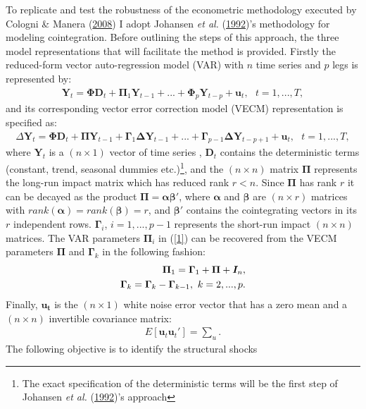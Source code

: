 \documentclass[11pt,preprint, authoryear]{elsarticle}
\numberwithin{equation}{section}
\numberwithin{figure}{section}
\numberwithin{table}{section}
\let\rmarkdownfootnote\footnote%
\def\footnote{\protect\rmarkdownfootnote}
\begin{document}
To replicate and test the robustness of the econometric methodology
executed by Cologni \& Manera
(\protect\hyperlink{ref-cologni2008}{2008}) I adopt Johansen \emph{et
al.} (\protect\hyperlink{ref-johansen1992}{1992})'s methodology for
modeling cointegration. Before outlining the steps of this approach, the
three model representations that will facilitate the method is provided.
Firstly the reduced-form vector auto-regression model (VAR) with \(n\)
time series and \(p\) legs is represented by: \begin{align}
\bm{Y}_t = \boldsymbol{\Phi} \bm{D}_t + \bm{\Pi}_1 \bm{Y}_{t-1} + ...+ \bm{\Phi}_p \bm{Y}_{t-p} + \bm{u}_t, \ \ \ t=1,...,T, \label{1}
\end{align} and its corresponding vector error correction model (VECM)
representation is specified as: \begin{align}
\Delta \bm{Y}_t = \bm{\Phi} \bm{D}_t + \bm{\Pi} \bm{Y}_{t-1} + \bm{\Gamma}_1 \bm{\Delta Y}_{t-1} + ... + \bm{\Gamma}_{p-1} \bm{\Delta} \bm{Y}_{t-p+1} + \bm{u}_t, \ \ \ t=1,...,T, \label{2}
\end{align} where \(\bm{Y}_t\) is a \((n \times 1)\) vector of time
series , \(\bm{D}_t\) contains the deterministic terms (constant, trend,
seasonal dummies etc.)\footnote{The exact specification of the
  deterministic terms will be the first step of Johansen \emph{et al.}
  (\protect\hyperlink{ref-johansen1992}{1992})'s approach}, and the
\((n \times n)\) matrix \(\bm{\Pi}\) represents the long-run impact
matrix which has reduced rank \(r<n\). Since \(\bm{\Pi}\) has rank \(r\)
it can be decayed as the product \(\bm{\Pi} = \bm{\alpha \beta'}\),
where \(\bm{\alpha}\) and \(\bm{\beta}\) are \((n \times r)\) matrices
with \(rank(\bm{\alpha})=rank(\bm{\beta}) = r\), and \(\bm{\beta'}\)
contains the cointegrating vectors in its \(r\) independent rows.
\(\bm{\Gamma}_i\), \(i=1,...,p-1\) represents the short-run impact
\((n \times n)\) matrices. The VAR parameters \(\bm{\Pi}_i\) in
(\ref{1}) can be recovered from the VECM parameters \(\bm{\Pi}\) and
\(\bm{\Gamma}_k\) in the following fashion: \begin{align}
\bm{\Pi}_1 = \bm{\Gamma}_1 + \bm{\Pi} + \bm{I}_n, \notag \\ \bm{\Gamma}_k = \bm{\Gamma}_k - \bm{\Gamma}_{k-1}, \ k=2,...,p. \notag
\end{align} Finally, \(\bm{u_t}\) is the \((n \times 1)\) white noise
error vector that has a zero mean and a \((n \times n)\) invertible
covariance matrix: \begin{align}
E[\bm{u}_t \bm{u}_t'] = \sum_u. \label{3}
\end{align} The following objective is to identify the structural shocks
\end{document}
